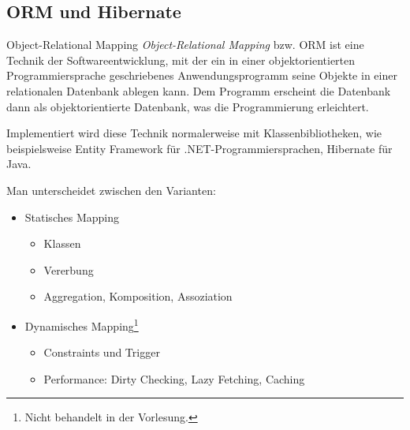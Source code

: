 \subsection{ORM und Hibernate}

\begin{defi}{Object-Relational Mapping}
    \emph{Object-Relational Mapping} bzw. ORM ist eine Technik der Softwareentwicklung, mit der ein in einer objektorientierten Programmiersprache geschriebenes Anwendungsprogramm seine Objekte in einer relationalen Datenbank ablegen kann. Dem Programm erscheint die Datenbank dann als objektorientierte Datenbank, was die Programmierung erleichtert.

    Implementiert wird diese Technik normalerweise mit Klassenbibliotheken, wie beispielsweise Entity Framework für .NET-Programmiersprachen, Hibernate für Java.

    Man unterscheidet zwischen den Varianten:
    \begin{itemize}
        \item Statisches Mapping
              \begin{itemize}
                  \item Klassen
                  \item Vererbung
                  \item Aggregation, Komposition, Assoziation
              \end{itemize}
        \item Dynamisches Mapping\footnote{Nicht behandelt in der Vorlesung.}
              \begin{itemize}
                  \item Constraints und Trigger
                  \item Performance: Dirty Checking, Lazy Fetching, Caching
              \end{itemize}
    \end{itemize}
\end{defi}

